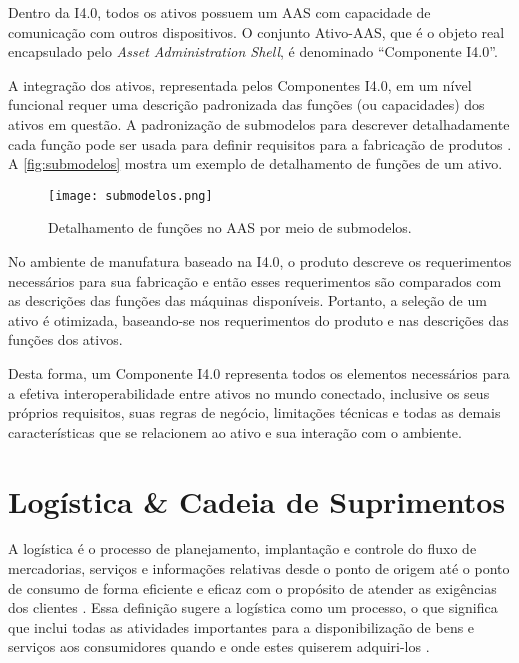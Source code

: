 	Dentro da I4.0, todos os ativos possuem um AAS com capacidade de comunicação com outros dispositivos. O conjunto Ativo-AAS, que é o objeto real encapsulado pelo \textit{Asset Administration Shell}, é denominado ``Componente I4.0''.
	
	A integração dos ativos, representada pelos Componentes I4.0, em um nível funcional requer uma descrição padronizada das funções (ou capacidades) dos ativos em questão. A padronização de submodelos para descrever detalhadamente cada função pode ser usada para definir requisitos para a fabricação de produtos \cite{bedenbender2017aasexamples}. A \autoref{fig:submodelos} mostra um exemplo de detalhamento de funções de um ativo.
	
	\begin{figure}[htb]
		\centering
		\caption{Detalhamento de funções no AAS por meio de submodelos.}
		\label{fig:submodelos}
		\texttt{[image: submodelos.png]}
	\end{figure}

	No ambiente de manufatura baseado na I4.0, o produto descreve os requerimentos necessários para sua fabricação e então esses requerimentos são comparados com as descrições das funções das máquinas disponíveis. Portanto, a seleção de um ativo é otimizada, baseando-se nos requerimentos do produto e nas descrições das funções dos ativos.
	
	Desta forma, um Componente I4.0 representa todos os elementos necessários para a efetiva interoperabilidade entre ativos no mundo conectado, inclusive os seus próprios requisitos, suas regras de negócio, limitações técnicas e todas as demais características que se relacionem ao ativo e sua interação com o ambiente.
	
\section{Logística \& Cadeia de Suprimentos}
\label{sec:logistica}
	
	A logística é o processo de planejamento, implantação e controle do fluxo de mercadorias, serviços e informações relativas desde o ponto de origem até o ponto de consumo de forma eficiente e eficaz com o propósito de atender as exigências dos clientes \cite{cscmp2013supplychainglossary}. Essa definição sugere a logística como um processo, o que significa que inclui todas as atividades importantes para a disponibilização de bens e serviços aos consumidores quando e onde estes quiserem adquiri-los \cite{ballou2006cadeiasuprimentos}.
	
